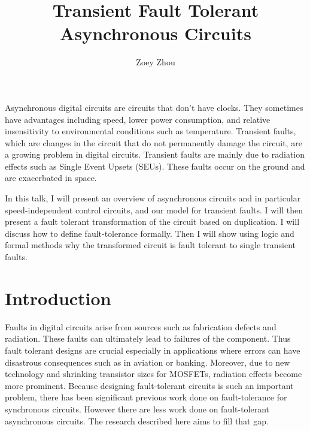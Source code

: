 \documentclass[12pt]{report}
\title{Transient Fault Tolerant Asynchronous Circuits}
\author{Zoey Zhou}
\begin{document}
\beforepreface

Asynchronous digital circuits are circuits that don’t have clocks. They sometimes have advantages including speed, lower power consumption, and relative insensitivity to environmental conditions such as temperature. Transient faults, which are changes in the circuit that do not permanently damage the circuit, are a growing problem in digital circuits. Transient faults are mainly due to radiation effects such as Single Event Upsets (SEUs). These faults occur on the ground and are exacerbated in space.

In this talk, I will present an overview of asynchronous circuits and in particular speed-independent control circuits, and our model for transient faults. I will then present a fault tolerant transformation of the circuit based on duplication. I will discuss how to define fault-tolerance formally. Then I will show using logic and formal methods why the transformed circuit is fault tolerant to single transient faults.
\newpage


\tablespagefalse
    \afterpreface

\chapter{Introduction}

Faults in digital circuits arise from sources such as fabrication defects and radiation.  These faults can ultimately lead to failures of the component.  Thus fault tolerant designs are crucial especially in applications where errors can have disastrous consequences such as in aviation or banking.  Moreover, due to new technology and shrinking transistor sizes for MOSFETs, radiation effects become more prominent.  Because designing fault-tolerant circuits is such an important problem, there has been significant previous work done on fault-tolerance for synchronous circuits.  However there are less work done on fault-tolerant asynchronous circuits.  The research described here aims to fill that gap.\\
\end{document}
